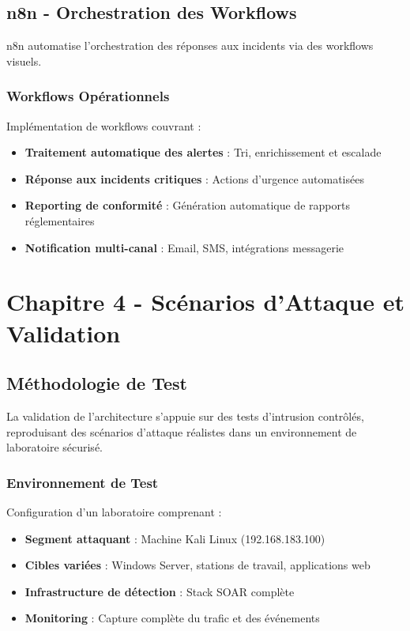 \subsection{n8n - Orchestration des Workflows}

n8n automatise l'orchestration des réponses aux incidents via des workflows visuels.

\subsubsection{Workflows Opérationnels}
Implémentation de workflows couvrant :
\begin{itemize}
    \item \textbf{Traitement automatique des alertes} : Tri, enrichissement et escalade
    \item \textbf{Réponse aux incidents critiques} : Actions d'urgence automatisées
    \item \textbf{Reporting de conformité} : Génération automatique de rapports réglementaires
    \item \textbf{Notification multi-canal} : Email, SMS, intégrations messagerie
\end{itemize}

\section{Chapitre 4 - Scénarios d'Attaque et Validation}

\subsection{Méthodologie de Test}

La validation de l'architecture s'appuie sur des tests d'intrusion contrôlés, reproduisant des scénarios d'attaque réalistes dans un environnement de laboratoire sécurisé.

\subsubsection{Environnement de Test}
Configuration d'un laboratoire comprenant :
\begin{itemize}
    \item \textbf{Segment attaquant} : Machine Kali Linux (192.168.183.100)
    \item \textbf{Cibles variées} : Windows Server, stations de travail, applications web
    \item \textbf{Infrastructure de détection} : Stack SOAR complète
    \item \textbf{Monitoring} : Capture complète du trafic et des événements
\end{itemize}

